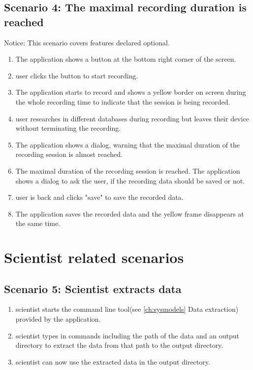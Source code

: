 \subsection{Scenario 4: The maximal recording duration is reached}
Notice: This scenario covers features declared optional.
\begin{enumerate}
    \item The application shows a button at the bottom right corner of the screen.
    \item \Gls{user} clicks the button to start recording.
    \item The application starts to record and shows a yellow border on screen during the whole recording time to indicate that the \gls{session} is being recorded.
    \item \Gls{user} researches in different databases during recording but leaves their \gls{device} without terminating the recording.
    \item The application shows a dialog, warning that the maximal duration of the recording \gls{session} \see[OC10] is almost reached.
    \item The maximal duration of the recording \gls{session} \see[OC10] is reached. The application shows a dialog to ask the \gls{user}, if the recording data should be saved or not.
    \item \Gls{user} is back and clicks "save" to save the recorded data.
    \item The application saves the recorded data and the yellow frame disappears at the same time.
\end{enumerate}

\section{Scientist related scenarios}
\subsection{Scenario 5: Scientist extracts data}
\begin{enumerate}
    \item \Gls{scientist} starts the command line tool(see \autoref{ch:sysmodels} Data extraction) provided by the application.
    \item \Gls{scientist} types in commands including the path of the data and an output directory to extract the data from that path to the output directory.
    \item \Gls{scientist} can now use the extracted data in the output directory.
\end{enumerate}


